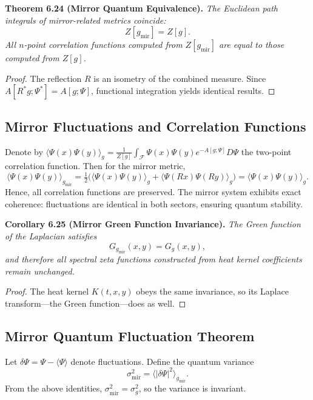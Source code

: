 \noindent
\textbf{Theorem 6.24 (Mirror Quantum Equivalence).}
\emph{The Euclidean path integrals of mirror-related metrics coincide:
\[
Z[g_{\mathrm{mir}}]=Z[g].
\]
All \(n\)-point correlation functions
computed from \(Z[g_{\mathrm{mir}}]\)
are equal to those computed from \(Z[g]\).}

\begin{proof}
The reflection \(R\) is an isometry of the combined measure.
Since \(A[R^{*}g;\Psi^{*}]=A[g;\Psi]\),
functional integration yields identical results.
\end{proof}

\subsection{Mirror Fluctuations and Correlation Functions}\relax \hspace{0pt}

Denote by
\(\langle \Psi(x)\Psi(y)\rangle_{g}
=\frac{1}{Z[g]}\int_{\mathcal{F}}\Psi(x)\Psi(y)e^{-A[g;\Psi]}D\Psi\)
the two-point correlation function.
Then for the mirror metric,
\[
\langle \Psi(x)\Psi(y)\rangle_{g_{\mathrm{mir}}}
=\tfrac{1}{2}\big(
\langle \Psi(x)\Psi(y)\rangle_{g}
+\langle \Psi(Rx)\Psi(Ry)\rangle_{g}
\big)
=\langle \Psi(x)\Psi(y)\rangle_{g}.
\]
Hence, all correlation functions are preserved.
The mirror system exhibits exact coherence:
fluctuations are identical in both sectors,
ensuring quantum stability.

\noindent
\textbf{Corollary 6.25 (Mirror Green Function Invariance).}
\emph{The Green function of the Laplacian satisfies}
\[
G_{g_{\mathrm{mir}}}(x,y)=G_{g}(x,y),
\]
\emph{and therefore all spectral zeta functions constructed from
heat kernel coefficients remain unchanged.}

\begin{proof}
The heat kernel \(K(t,x,y)\) obeys the same invariance,
so its Laplace transform—the Green function—does as well.
\end{proof}

\subsection{Mirror Quantum Fluctuation Theorem}\relax \hspace{0pt}

Let \(\delta\Psi=\Psi-\langle\Psi\rangle\) denote fluctuations.
Define the quantum variance
\[
\sigma_{\mathrm{mir}}^{2}
=\langle|\delta\Psi|^{2}\rangle_{g_{\mathrm{mir}}}.
\]
From the above identities,
\(\sigma_{\mathrm{mir}}^{2}=\sigma_{g}^{2}\),
so the variance is invariant.

